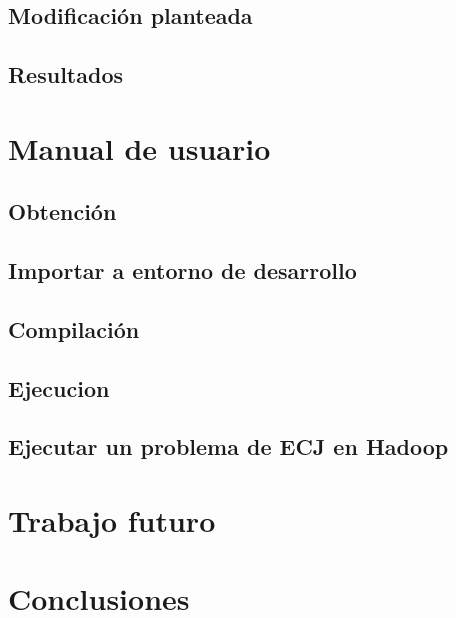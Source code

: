 \documentclass{estilos-y-libreria}
\begin{document}
	\section{Modificación planteada}
		
	\section{Resultados}
		

\chapter{Manual de usuario}\label{manual-usuario}
	\section{Obtenci\'on}
		
	\section{Importar a entorno de desarrollo}
		
	\section{Compilaci\'on}
		
	\section{Ejecucion}\label{ejecucion}
		
	\section{Ejecutar un problema de ECJ en Hadoop}
		

\chapter{Trabajo futuro}\label{trabajo-futuro}
	
	
\chapter{Conclusiones}\label{conclusiones}
	

\end{document}
